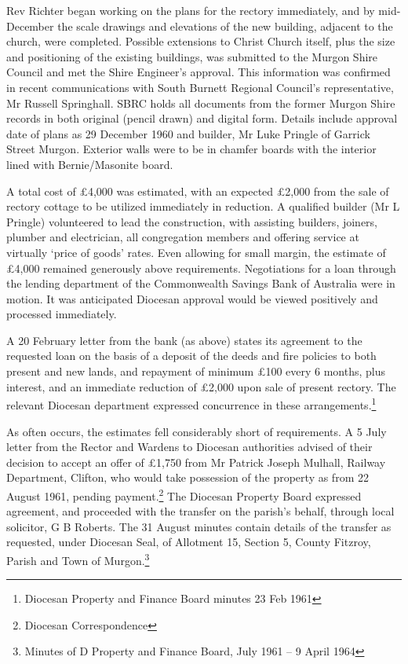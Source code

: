 Rev Richter began working on the plans for the rectory immediately, and by mid-December the scale drawings and elevations of the new building, adjacent to the church, were completed. Possible extensions to Christ Church itself, plus the size and positioning of the existing buildings, was submitted to the Murgon Shire Council and met the Shire Engineer's approval. This information was confirmed in recent communications with South Burnett Regional Council's representative, Mr Russell Springhall. SBRC holds all documents from the former Murgon Shire records in both original (pencil drawn) and digital form. Details include approval date of plans as 29 December 1960 and builder, Mr Luke Pringle of Garrick Street Murgon. Exterior walls were to be in chamfer boards with the interior lined with Bernie/Masonite board.



A total cost of \pounds4,000 was estimated, with an expected \pounds2,000 from the sale of rectory cottage to be utilized immediately in reduction. A qualified builder (Mr L Pringle) volunteered to lead the construction, with assisting builders, joiners, plumber and electrician, all congregation members and offering service at virtually `price of goods' rates. Even allowing for small margin, the estimate of \pounds4,000 remained generously above requirements. Negotiations for a loan through the lending department of the Commonwealth Savings Bank of Australia were in motion. It was anticipated Diocesan approval would be viewed positively and processed immediately.



A 20 February letter from the bank (as above) states its agreement to the requested loan on the basis of a deposit of the deeds and fire policies to both present and new lands, and repayment of minimum \pounds100 every 6 months, plus interest, and an immediate reduction of \pounds2,000 upon sale of present rectory. The relevant Diocesan department expressed concurrence in these arrangements.\footnote{Diocesan Property and Finance Board minutes 23 Feb 1961}


As often occurs, the estimates fell considerably short of requirements. A 5 July letter from the Rector and Wardens to Diocesan authorities advised of their decision to accept an offer of \pounds1,750 from Mr Patrick Joseph Mulhall, Railway Department, Clifton, who would take possession of the property as from 22 August 1961, pending payment.\footnote{Diocesan Correspondence} The Diocesan Property Board expressed agreement, and proceeded with the transfer on the parish's behalf, through local solicitor, G B Roberts. The 31 August minutes contain details of the transfer as requested, under Diocesan Seal, of Allotment 15, Section 5, County Fitzroy, Parish and Town of Murgon.\footnote{Minutes of D Property and Finance Board, July 1961 -- 9 April 1964}


